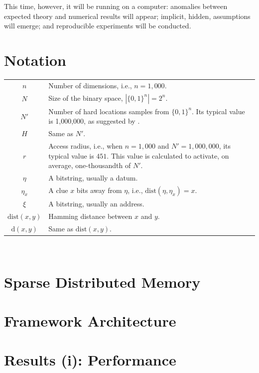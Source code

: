 This time, however, it will be running on a computer:   anomalies between expected theory and numerical results will appear; implicit, hidden, assumptions will emerge; and reproducible experiments will be conducted.





\chapter{Notation}

\begin{tabular}{cp{\textwidth}}
  $n$ & Number of dimensions, i.e., $n=1,000$. \\
  $N$ & Size of the binary space, $|\{0, 1\}^n| = 2^n$. \\
  $N'$ & Number of hard locations samples from $\{0, 1\}^n$. Its typical value is 1,000,000, as suggested by \citet{Kanerva1988}. \\
  $H$ & Same as $N'$. \\
  $r$ & Access radius, i.e., when $n=1,000$ and $N'=1,000,000$, its typical value is $451$. This value is calculated to activate, on average, one-thousandth of $N'$. \\
  $\eta$ & A bitstring, usually a datum. \\
  $\eta_x$ & A clue $x$ bits away from $\eta$, i.e., $\text{dist}(\eta, \eta_x) = x$. \\
  $\xi$ & A bitstring, usually an address. \\
  $\text{dist}(x, y)$ & Hamming distance between $x$ and $y$. \\
  $\text{d}(x, y)$ & Same as $\text{dist}(x, y)$.
\end{tabular}\\

\chapter{Sparse Distributed Memory}



\chapter{Framework Architecture}


\chapter{Results (i): Performance}


